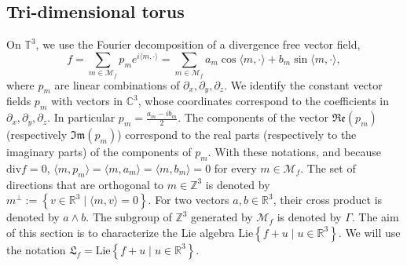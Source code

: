 \documentclass[10pt]{article}
\newcommand{\p}{\partial}
\newcommand{\C}{{\mathbb C}}
\newcommand{\R}{{\mathbb R}}
\newcommand{\T}{{\mathbb T}}
\newcommand{\Z}{{\mathbb Z}}
\newcommand{\M}{{\mathcal M}}
\newcommand{\ta}{\theta}
\newcommand{\la}{\langle}
\newcommand{\ra}{\rangle}
\newcommand{\we}{\wedge}
\newtheorem{theorem}{Theorem}
\begin{document}
\subsection{Tri-dimensional torus}

On $\T^3$, we use the Fourier decomposition of a divergence free vector field, 
$$f=\sum_{m \in \M_f}p_me^{i\la m,\cdot \ra}=\sum_{m\in \M_f}a_m\cos\la m,\cdot \ra +b_m\sin\la m, \cdot \ra,$$ 
where $p_m$ are linear combinations of $\p_x,\p_y,\p_z$. We identify the constant vector fields $p_m$ with vectors in $\C^3$, whose coordinates correspond to the coefficients in $\p_x,\p_y,\p_z$. In particular $p_m=\frac{a_m-ib_m}{2}$. The components of the vector $\mathfrak{Re}(p_m)$ (respectively $\mathfrak{Im}(p_m)$) correspond to the real parts (respectively to the imaginary parts) of the components of $p_m$. With these notations, and because $\mathrm{div} f=0$, $\la m,p_m\ra =\la m,a_m\ra=\la m,b_m \ra=0$ for every $m \in \M_f$. The set of directions that are orthogonal to $m\in \Z^3$ is denoted by $m^{\perp}:=\left\{v \in \R^3\mid \la m,v \ra =0\right\}$. 
For two vectors $a,b\in \R^3$, their cross product is denoted by $a\we b$. The subgroup of $\Z^3$ generated by $\M_f$ is denoted by $\Gamma$. The aim of this section is to characterize the Lie algebra $\mathrm{Lie}\left\{f+u \mid u \in \R^3\right\}$. We will use the notation $\mathfrak{L}_f=\mathrm{Lie}\left\{f+u \mid u \in \R^3\right\}$. 
\end{document}
